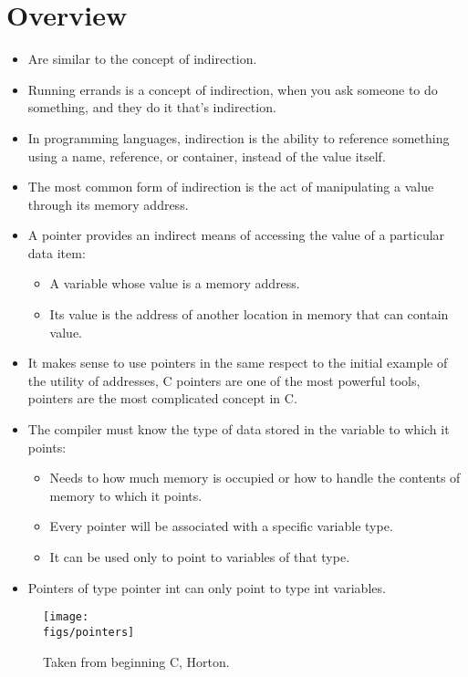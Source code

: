 \section{Overview}
\begin{itemize}
    \item Are similar to the concept of indirection.
    \item Running errands is a concept of indirection, when you ask someone to do something, and they do it that's indirection. 
    \item In programming languages, indirection is the ability to reference something using a name, reference, or container, instead of the value itself. 
    \item The most common form of indirection is the act of manipulating a value through its memory address.
    \item A pointer provides an indirect means of accessing the value of a particular data item:
        \begin{itemize}
            \item A variable whose value is a memory address.
            \item Its value is the address of another location in memory that can contain value. 
        \end{itemize}
    
    \item It makes sense to use pointers in the same respect to the initial example of the utility of addresses, C pointers are one of the most powerful tools, pointers are the most complicated concept in C. 
    \item The compiler must know the type of data stored in the variable to which it points: 
        \begin{itemize}
            \item Needs to how much memory is occupied or how to handle the contents of memory to which it points. 
            \item Every pointer will be associated with a specific variable type. 
            \item It can be used only to point to variables of that type.  
        \end{itemize}
    
    \item Pointers of type pointer int can only point to type int variables. 
\end{itemize}

\begin{figure}[H]
    \centering
    \texttt{[image: \\figs/pointers]} 
    \caption{Taken from beginning C, Horton.}
\end{figure}

